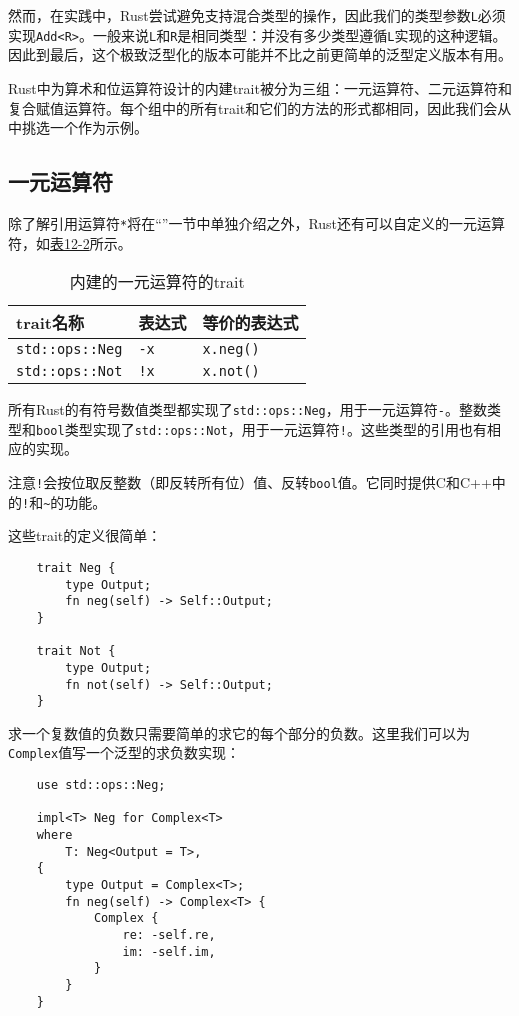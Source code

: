 然而，在实践中，Rust尝试避免支持混合类型的操作，因此我们的类型参数\texttt{L}必须实现\texttt{Add<R>}。一般来说\texttt{L}和\texttt{R}是相同类型：并没有多少类型遵循\texttt{L}实现的这种逻辑。因此到最后，这个极致泛型化的版本可能并不比之前更简单的泛型定义版本有用。

Rust中为算术和位运算符设计的内建trait被分为三组：一元运算符、二元运算符和复合赋值运算符。每个组中的所有trait和它们的方法的形式都相同，因此我们会从中挑选一个作为示例。

\subsection{一元运算符}\label{unop}
除了解引用运算符\texttt{*}将在“”一节中单独介绍之外，Rust还有可以自定义的一元运算符，如\hyperref[t12-2]{表12-2}所示。

\begin{table}[htbp]
    \centering
    \caption{内建的一元运算符的trait}
    \label{t12-2}
    \begin{tabular}{p{}p{}p{}}
        \hline
        \textbf{trait名称}  & \textbf{表达式}   & \textbf{等价的表达式} \\
        \hline
        \texttt{std::ops::Neg}  & \texttt{-x}   & \texttt{x.neg()}  \\
        \rowcolor{tablecolor}
        \texttt{std::ops::Not}  & \texttt{!x}   & \texttt{x.not()}  \\
    \end{tabular}
\end{table}

所有Rust的有符号数值类型都实现了\texttt{std::ops::Neg}，用于一元运算符\texttt{-}。整数类型和\texttt{bool}类型实现了\texttt{std::ops::Not}，用于一元运算符\texttt{!}。这些类型的引用也有相应的实现。

注意\texttt{!}会按位取反整数（即反转所有位）值、反转\texttt{bool}值。它同时提供C和C++中的\texttt{!}和\texttt{\~{}}的功能。

这些trait的定义很简单：
\begin{verbatim}
    trait Neg {
        type Output;
        fn neg(self) -> Self::Output;
    }

    trait Not {
        type Output;
        fn not(self) -> Self::Output;
    }
\end{verbatim}

求一个复数值的负数只需要简单的求它的每个部分的负数。这里我们可以为\texttt{Complex}值写一个泛型的求负数实现：
\begin{verbatim}
    use std::ops::Neg;

    impl<T> Neg for Complex<T>
    where
        T: Neg<Output = T>,
    {
        type Output = Complex<T>;
        fn neg(self) -> Complex<T> {
            Complex {
                re: -self.re,
                im: -self.im,
            }
        }
    }
\end{verbatim}

